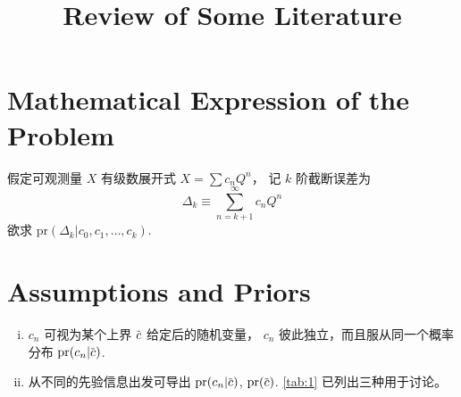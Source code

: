 \documentclass[12pt]{article}
\title{Review of Some Literature}
\newcommand*\dmspr{\textrm{pr}}
\def\dmscbar{\dmsbar{c}}
\def\dmsccck{c_0,c_1,\ldots,c_k}
\begin{document}
\maketitle
\tableofcontents

\section{Mathematical Expression of the Problem}
假定可观测量 $X$ 有级数展开式 $X=\sum c_nQ^n$，
记 $k$ 阶截断误差为
\begin{equation}
  \Delta_k\equiv\sum_{n=k+1}^\infty c_nQ^n
\end{equation}
欲求 $\dmspr(\Delta_k|\dmsccck)$.

\section{Assumptions and Priors}
\begin{enumerate}[i)]
\item $c_n$ 可视为某个上界 $\dmscbar$ 给定后的随机变量，
  $c_n$ 彼此独立，而且服从同一个概率分布 $\dmspr(c_n|\dmscbar)$.
\item 从不同的先验信息出发可导出 $\dmspr(c_n|\dmscbar)$,
  $\dmspr(\dmscbar)$. \autoref{tab:1} 已列出三种用于讨论。
\end{enumerate}
\end{document}
